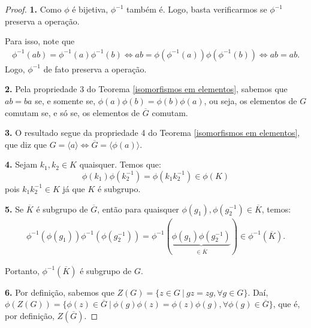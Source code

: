 	\begin{proof}
		\textbf{1.} Como $\phi$ é bijetiva, $\phi^{-1}$ também é. 
		Logo, basta verificarmos se $\phi^{-1}$ preserva a operação.
		\par\vspace{0.3cm} Para isso, note que 
		\begin{align*}
		    \phi^{-1}(ab) 
		    = \phi^{-1}(a)\phi^{-1}(b) \iff ab 
		    = \phi(\phi^{-1}(a))\phi(\phi^{-1}(b)) \iff ab = ab.
		\end{align*} 
		Logo, $\phi^{-1}$ de fato preserva a operação.
		\par\vspace{0.4cm}
		\textbf{2.} Pela propriedade 3 do Teorema 
		\ref{isomorfismos em elementos}, sabemos que $ab = ba$ se, e
		somente se, $\phi(a)\phi(b) = \phi(b)\phi(a)$, ou seja, os
		elementos de $G$ comutam se, e só se, os elementos de 
		$\overline{G}$ comutam.
		\par\vspace{0.4cm}
		\textbf{3.} O resultado segue da propriedade 4 do
		Teorema \ref{isomorfismos em elementos}, que diz que 
		$G = \langle a\rangle \iff \overline{G} 
		= \langle \phi(a)\rangle$.
		\par\vspace{0.4cm}
		\textbf{4.} Sejam $k_1, k_2 \in K$ quaisquer. Temos que:
		\begin{equation*}
		    \phi(k_1)\phi(k_2^{-1}) = \phi(k_1k_2^{-1}) \in\phi(K)
		\end{equation*}
		pois $k_1k_2^{-1} \in K$ já que $K$ é subgrupo.
		\par\vspace{0.4cm}
		\textbf{5.} Se $\overline{K}$ é subgrupo de $\overline{G}$, 
		então para quaisquer $\phi(g_1), \phi(g_2^{-1})\in \overline{K}$,
		temos:
		\begin{align*}
		    \phi^{-1}(\phi(g_1))\phi^{-1}(\phi(g_2^{-1})) 
		    = \phi^{-1}(\underbrace{\phi(g_1)\phi(g_2^{-1})}_{\in\overline{K}}) 
		    \in \phi^{-1}(\overline{K}).
		\end{align*}
		\par\vspace{0.3cm} Portanto, $\phi^{-1}(\overline{K})$ é 
		subgrupo de $G$.
		\par\vspace{0.4cm}
		\textbf{6.} Por definição, sabemos que 
		$Z(G) = \{ z\in G \ | \ gz = zg, \forall g\in G \}$. Daí, 
		$\phi(Z(G)) = 
		\{ \phi(z)\in \overline{G} \ | \ \phi(g)\phi(z) 
		= \phi(z)\phi(g), \forall \phi(g)\in\overline{G}\}$, que é, 
		por definição, $Z(\overline{G})$.
	\end{proof}
